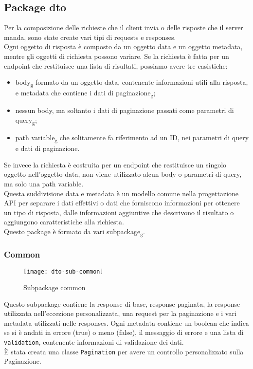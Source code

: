 \subsection{Package dto}
Per la composizione delle richieste che il client invia o delle risposte che il server manda, sono state create vari tipi di requests e responses.\\
Ogni oggetto di risposta è composto da un oggetto data e un oggetto metadata, mentre gli oggetti di richiesta possono variare. Se la richiesta è fatta per un endpoint che restituisce una lista di risultati, possiamo avere tre casistiche:
\begin{itemize}
\item body\textsubscript{g} formato da un oggetto data, contenente informazioni utili alla risposta, e metadata che contiene i dati di paginazione\textsubscript{g};
\item nessun body, ma soltanto i dati di paginazione passati come parametri di query\textsubscript{g};
\item path variable\textsubscript{g} che solitamente fa riferimento ad un ID, nei parametri di query e dati di paginazione.
\end{itemize}
Se invece la richiesta è costruita per un endpoint che restituisce un singolo oggetto nell'oggetto data, non viene utilizzato alcun body o parametri di query, ma solo una path variable.\\
Questa suddivisione data e metadata è un modello comune nella progettazione API per separare i dati effettivi o dati che forniscono informazioni per ottenere un tipo di risposta, dalle informazioni aggiuntive che descrivono il risultato o aggiungono caratteristiche alla richiesta.\\
Questo package è formato da vari subpackage\textsubscript{g}.
\subsubsection{Common}
\begin{figure}[H] 
    \centering 
    \texttt{[image: dto-sub-common]} 
    \caption{Subpackage common}
\end{figure}
Questo subpackage contiene la response di base, response paginata, la response utilizzata nell'eccezione personalizzata, una request per la paginazione e i vari metadata utilizzati nelle responses. Ogni metadata contiene un boolean che indica se si è andati in errore (true) o meno (false), il messaggio di errore e una lista di \texttt{validation}, contenente informazioni di validazione dei dati.\\
È stata creata una classe \texttt{Pagination} per avere un controllo personalizzato sulla Paginazione.
